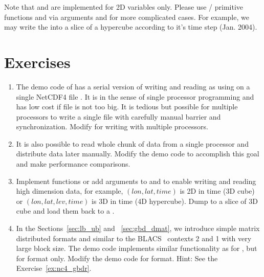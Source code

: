 Note that  and  are implemented
for 2D variables only. Please use / primitive functions
 and  via arguments 
and  for more complicated cases. For example, we may write
the  into a slice of a hypercube according to it's time step
(Jan. 2004).


\section{Exercises}
\label{sec:pbdNCDF4_exercise}

\begin{enumerate}[label=\thechapter-\arabic*]
\item
The demo code  of  has a serial version
of writing and reading  as using  on a single
NetCDF4 file . It is in the sense of single processor
programming and has low cost if file is not too big.
It is tedious but possible for multiple processors to write
a single file with carefully manual barrier and synchronization.
Modify  for writing with multiple processors.

\item
It is also possible to read whole chunk of data from a single processor
and distribute data later manually. Modify the demo code
 to accomplish this goal and make performance
comparisons.

\item
Implement functions or add arguments to  and
 to enable writing and reading high dimension data,
for example, $(lon, lat, time)$ is 2D in time (3D cube) or
$(lon, lat, lev, time)$ is 3D in time (4D hypercube).
Dump  to a slice of 3D cube and load them back to a
.

\item
In the Sections~\ref{sec:lb_ub} and ~\ref{sec:gbd_dmat}, we introduce
simple matrix distributed formats  and  similar to
the BLACS~ contexts  2 and 1 with very large block size.
The demo code
 implements similar functionality as for
, but for  format only. Modify the demo code for
 format.
{\color{blue}Hint: See the Exercise~\ref{ex:nc4_gbdr}.
}

\end{enumerate}

